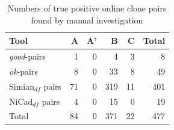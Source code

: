 \documentclass{sig-alternate-05-2015}
\begin{document}
\begin{table}[H]
	\centering
	\caption{Numbers of true positive online clone pairs found by manual investigation}
	\label{tab:classification_true_pairs_summary}
	\small
	\begin{tabular}{l|r|r|r|r|r}
		\hline 
		Tool & A & A' & B & C & Total \\
		\hline
		\textit{good}-pairs & 1 & 0 & 4 & 3 & 8 \\
		\textit{ok}-pairs & 8 & 0 & 33 & 8 & 49 \\
		Simian$_{df}$ pairs & 71 & 0 & 319 & 11 & 401 \\
		NiCad$_{df}$ pairs & 4 & 0 & 15 & 0 & 19 \\
		\hline 
		Total & 84 & 0 & 371 & 22 & 477 \\
		\hline
	\end{tabular} 
\end{table}
\end{document}
